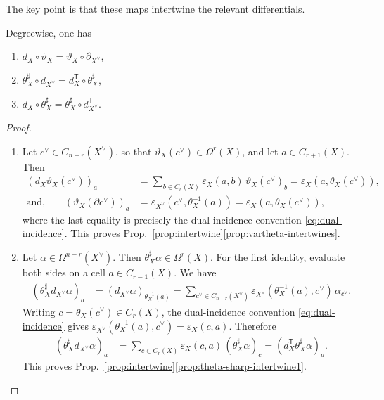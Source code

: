 The key point is that these maps intertwine the relevant differentials.
\begin{prop}\label{prop:intertwine}
	Degreewise, one has
	\begin{enumerate}[label=(\roman*)]
		\item \label{prop:vartheta-intertwines} $d_X\circ \vartheta_X = \vartheta_X\circ \partial_{X^\vee}$,
		\item \label{prop:theta-sharp-intertwine1} $\theta_X^\sharp\circ d_{X^\vee}
		=
		d_X^{\mathsf T}\circ \theta_X^\sharp$,
		\item \label{prop:theta-sharp-intertwine2} $d_X\circ \theta_X^\sharp
		=
		\theta_X^\sharp\circ d_{X^\vee}^{\mathsf T}$.
	\end{enumerate}
\end{prop}
\begin{proof}
	\begin{enumerate}
		\item Let
		\(c^\vee\in C_{n-r}(X^\vee)\), so that
		\(\vartheta_X(c^\vee)\in \Omega^r(X)\), and let \(a\in C_{r+1}(X)\). Then
		\begin{align*}
			\left(d_X\vartheta_X(c^\vee)\right)_a
			&=
			\sum_{b\in C_r(X)}
			\varepsilon_X(a,b)\,\vartheta_X(c^\vee)_b
			=
			\varepsilon_X\left(a,\theta_X(c^\vee)\right),
			\\
			\text{and,} \qquad \left(\vartheta_X(\partial c^\vee)\right)_a
			&=
			\varepsilon_{X^\vee}\left(c^\vee,\theta_X^{-1}(a)\right)
			=
			\varepsilon_X\left(a,\theta_X(c^\vee)\right),
		\end{align*}
		where the last equality is precisely the dual-incidence convention
		\eqref{eq:dual-incidence}. This proves Prop.~\ref{prop:intertwine}\ref{prop:vartheta-intertwines}.
		
		\item Let \(\alpha\in \Omega^{n-r}(X^\vee)\). Then $\theta_X^\sharp\alpha\in \Omega^r(X)$.
		For the first identity, evaluate both sides on a cell \(a\in C_{r-1}(X)\). We have
		\begin{align*}
			\left(\theta_X^\sharp d_{X^\vee}\alpha\right)_a
			&=
			\left(d_{X^\vee}\alpha\right)_{\theta_X^{-1}(a)}
			=
			\sum_{c^\vee\in C_{n-r}(X^\vee)}
			\varepsilon_{X^\vee}\left(\theta_X^{-1}(a),c^\vee\right)\,
			\alpha_{c^\vee}.
		\end{align*}
		Writing \(c=\theta_X(c^\vee)\in C_r(X)\), the dual-incidence convention \eqref{eq:dual-incidence} gives
		$
			\varepsilon_{X^\vee}\left(\theta_X^{-1}(a),c^\vee\right)
			=
			\varepsilon_X(c,a)
		$.
		Therefore
		\begin{align}
			\left(\theta_X^\sharp d_{X^\vee}\alpha\right)_a
			&=
			\sum_{c\in C_r(X)}
			\varepsilon_X(c,a)\,
			(\theta_X^\sharp\alpha)_c
			=
			\left(d_X^{\mathsf T}\theta_X^\sharp\alpha\right)_a.
		\end{align}
		This proves Prop.~\ref{prop:intertwine}\ref{prop:theta-sharp-intertwine1}.
		

\end{enumerate}
\end{proof}
